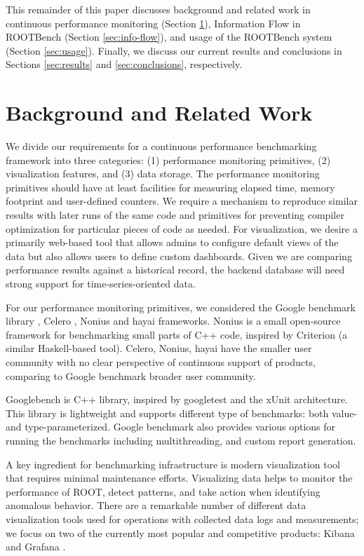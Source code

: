 \documentclass{webofc}
\begin{document}
This remainder of this paper discusses background and related work in continuous performance monitoring (Section \ref{sec:background}), Information Flow in ROOTBench (Section \ref{sec:info-flow}), and usage of the ROOTBench system (Section \ref{sec:usage}).  Finally, we discuss our current results and conclusions in Sections \ref{sec:results} and \ref{sec:conclusions}, respectively.
 
\section{Background and Related Work} \label{sec:background}

We divide our requirements for a continuous performance benchmarking framework into three categories: (1) performance monitoring primitives, (2) visualization features, and (3) data storage. The performance monitoring primitives should have at least facilities for measuring elapsed time, memory footprint and user-defined counters. We require a mechanism to reproduce similar results with later runs of the same code and  primitives for preventing compiler optimization for particular pieces of code as needed.  For visualization, we desire a primarily web-based tool that allows admins to configure default views of the data but also allows users  to define custom dashboards. Given we are comparing performance results against a historical record, the backend database will need strong support for time-series-oriented data.

For our performance monitoring primitives, we considered the Google benchmark library \cite{gbench}, Celero \cite{celero}, Nonius \cite{nonius} and hayai \cite{hayai} frameworks. Nonius is a small open-source framework for benchmarking small parts of C++ code, inspired by Criterion (a similar Haskell-based tool). Celero, Nonius, hayai have the smaller user community with no clear perspective of continuous support of products, comparing to Google benchmark broader user community.

Googlebench is C++ library, inspired by googletest \cite{gtest} and the xUnit \cite{xunit} architecture.  This library is lightweight and supports different type of benchmarks: both value- and type-parameterized. Google benchmark also provides various options for running the benchmarks including multithreading, and custom report generation.


A key ingredient for benchmarking infrastructure is modern visualization tool that requires minimal maintenance efforts. Visualizing data helps to monitor the performance of ROOT, detect patterns, and take action when identifying anomalous behavior. There are a remarkable number of different data visualization tools used for operations with collected data logs and measurements; we focus on two of the currently most popular and competitive products: Kibana \cite{kibana} and Grafana \cite{grafana}.
\end{document}
